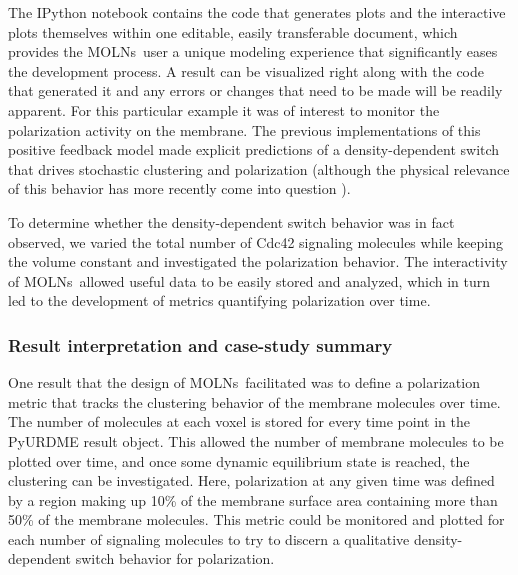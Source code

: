 \documentclass[final,leqno,onefignum,onetabnum]{siamltex1213}
\def\packagename {MOLNs}
\begin{document}
The IPython notebook contains the code that generates plots and the interactive plots themselves within one editable, easily transferable document, which provides the \packagename~user a unique modeling experience that significantly eases the development process. A result can be visualized right along with the code that generated it and any errors or changes that need to be made will be readily apparent. For this particular example it was of interest to monitor the polarization activity on the membrane. The previous implementations of this positive feedback model \cite{Altschuler2011} made explicit predictions of a density-dependent switch that drives stochastic clustering and polarization (although the physical relevance of this behavior has more recently come into question  \cite{Frei1}). 

To determine whether the density-dependent switch behavior was in fact observed, we varied the total number of Cdc42 signaling molecules while keeping the volume constant and investigated the polarization behavior. The interactivity of \packagename~allowed useful data to be easily stored and analyzed, which in turn led to the development of metrics quantifying polarization over time.

\subsubsection{Result interpretation and case-study summary}
One result that the design of \packagename~facilitated was to define a polarization metric that tracks the clustering behavior of the membrane molecules over time. The number of molecules at each voxel is stored for every time point in the PyURDME result object. This allowed the number of membrane molecules to be plotted over time, and once some dynamic equilibrium state is reached, the clustering can be investigated. Here, polarization at any given time was defined by a region making up 10\% of the membrane surface area containing more than 50\% of the membrane molecules.
This metric could be monitored and plotted for each number of signaling molecules to try to discern a qualitative density-dependent switch behavior for polarization. 
\end{document}
